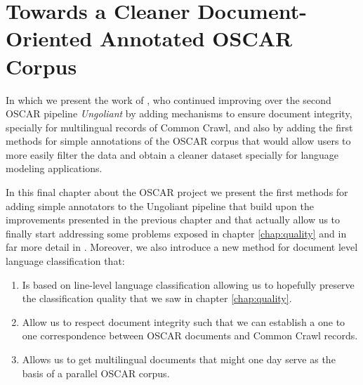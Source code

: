 \chapter{Towards a Cleaner Document-Oriented Annotated OSCAR Corpus}\label{chap:towards}

\begin{center}
    \begin{minipage}{0.66\textwidth}
        \begin{small}
            In which we present the work of \citet{abadji-etal-2022-towards}, who continued improving over the second OSCAR pipeline \emph{Ungoliant} by adding mechanisms to ensure document integrity, specially for multilingual records of Common Crawl, and also by adding the first methods for simple annotations of the OSCAR corpus that would allow users to more easily filter the data and obtain a cleaner dataset specially for language modeling applications.\footnotemark
        \end{small}
    \end{minipage}
    \vspace{0.5cm}
\end{center}


In this final chapter about the OSCAR project we present the first methods for adding simple annotators to the Ungoliant pipeline that build upon the improvements presented in the previous chapter and that actually allow us to finally start addressing some problems exposed in chapter \ref{chap:quality} and in far more detail in \citep{caswell-etal-2020-language,kreutzer-etal-2021-quality}. Moreover, we also introduce a new method for document level language classification that:

\begin{enumerate}
    \item Is based on line-level language classification allowing us to hopefully preserve the classification quality that we saw in chapter \ref{chap:quality}.
    \item Allow us to respect document integrity such that we can establish a one to one correspondence between OSCAR documents and Common Crawl records.
    \item Allows us to get multilingual documents that might one day serve as the basis of a parallel OSCAR corpus.
\end{enumerate}

